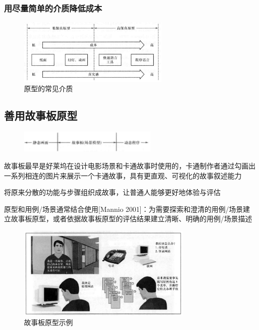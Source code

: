 \subsubsection{用尽量简单的介质降低成本}
\begin{figure}[H]
	\centering
    \vspace{-1em}
	\includegraphics[width=0.65\textwidth]{img/原型的常见介质.png}
    \caption*{原型的常见介质}
    \vspace{-1em}
\end{figure}

\subsection{善用故事板原型}
\begin{figure}[H]
	\centering
    \vspace{-1em}
	\includegraphics[width=0.6\textwidth]{img/故事板原型.png}
    \vspace{-1em}
\end{figure}

故事板最早是好莱坞在设计电影场景和卡通故事时使用的，卡通制作者通过勾画出一系列相连的图片来展示一个卡通故事，具有更直观、可视化的故事叙述能力

将原来分散的功能与步骤组织成故事，让普通人能够更好地体验与评估

原型和用例/场景通常结合使用[Mannio 2001]：为需要探索和澄清的用例/场景建立故事板原型，或者依据故事板原型的评估结果建立清晰、明确的用例/场景描述

\begin{figure}[H]
	\centering
    \vspace{-1em}
	\includegraphics[width=0.75\textwidth]{img/故事板原型示例.png}
    \caption*{故事板原型示例}
    \vspace{-1em}
\end{figure}

